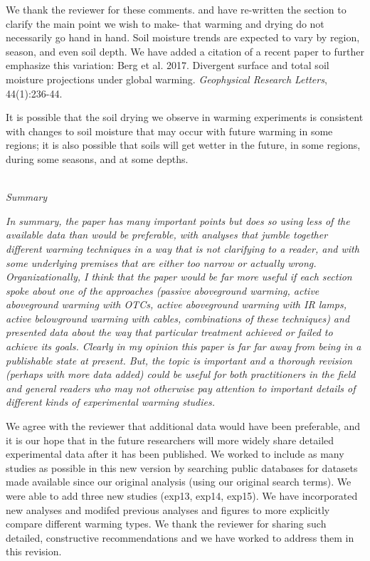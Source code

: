 \documentclass[11pt,a4paper]{letter}
\begin{document}
\begin{letter}{}
\par We thank the reviewer for these comments. and have re-written the section to clarify the main point we wish to make- that warming and drying do not necessarily go hand in hand. Soil moisture trends are expected to vary by region, season, and even soil depth. We have added a citation of a recent paper to further emphasize this variation: Berg et al. 2017. Divergent surface and total soil moisture projections under global warming. \emph{Geophysical Research Letters}, 44(1):236-44. 
\par It is possible that the soil drying we observe in warming experiments is consistent with changes to soil moisture that may occur with future warming in some regions; it is also possible that soils will get wetter in the future, in some regions, during some seasons, and at some depths. 

\\
\emph{Summary}

\emph{In summary, the paper has many important points but does so using less of the available data
than would be preferable, with analyses that jumble together different warming techniques in a
way that is not clarifying to a reader, and with some underlying premises that are either too
narrow or actually wrong. Organizationally, I think that the paper would be far more useful if
each section spoke about one of the approaches (passive aboveground warming, active
aboveground warming with OTCs, active aboveground warming with IR lamps, active
belowground warming with cables, combinations of these techniques) and presented data
about the way that particular treatment achieved or failed to achieve its goals. Clearly in my
opinion this paper is far far away from being in a publishable state at present. But, the topic is
important and a thorough revision (perhaps with more data added) could be useful for both
practitioners in the field and general readers who may not otherwise pay attention to
important details of different kinds of experimental warming studies.}

\par We agree with the reviewer that additional data would have been preferable, and it is our hope that in the future researchers will more widely share detailed experimental data after it has been published. We worked to include as many studies as possible in this new version by searching public databases for datasets made available since our original analysis (using our original search terms). We were able to add three new studies (exp13, exp14, exp15). We have incorporated new analyses and modifed previous analyses and figures to more explicitly compare different warming types. We thank the reviewer for sharing such detailed, constructive recommendations and we have worked to address them in this revision.



\end{letter}
\end{document}
